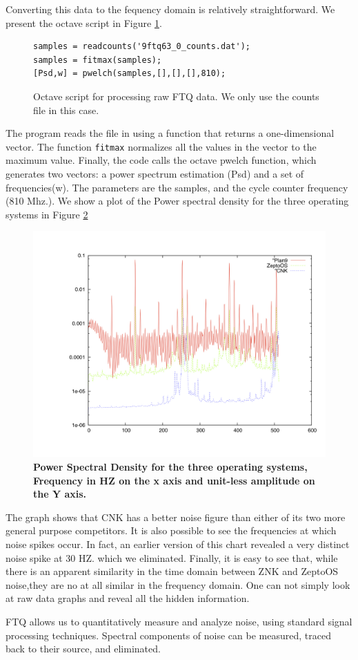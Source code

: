 Converting this data to the fequency domain is relatively straightforward. We present the octave script in Figure \ref{octave}. 
\begin{figure}[h]
\begin{center}
\begin{verbatim}
samples = readcounts('9ftq63_0_counts.dat');
samples = fitmax(samples);
[Psd,w] = pwelch(samples,[],[],[],810);
\end{verbatim}
\caption{Octave script for processing raw FTQ data. We only use the counts file in this case.}
\label{octave}
\end{center}
\end{figure}
The program reads the file in using a function that returns a one-dimensional vector. The function
{\tt fitmax} normalizes all the values in the vector to the maximum value. Finally, 
the code calls the octave pwelch function, which generates two vectors: a power spectrum estimation (Psd) and a set of frequencies(w). The parameters are the samples, and the 
cycle counter 
frequency (810 Mhz.). 
We show a plot of the Power spectral density for the three operating systems in Figure \ref{psd}
\begin{figure}[htbp]
\begin{center}
 \includegraphics[width=5in]{spectrum.jpg}
\caption{{\bf Power Spectral Density for the three operating systems, Frequency in HZ on the x axis
and unit-less amplitude on the Y axis.}}
\label{psd}
\end{center}
\end{figure}

The graph shows that CNK has a better noise figure than either of its two
more general purpose competitors. It is also possible to see
the frequencies at which noise spikes occur. In fact, an earlier version 
of this chart revealed a very distinct noise spike at 30 HZ. which we 
eliminated. Finally, it is easy to see that, while there is an apparent similarity in the time
domain between ZNK and ZeptoOS noise,they are no at all similar in the
frequency domain. One can not simply look at raw data graphs and 
reveal all the hidden information. 

FTQ allows us to quantitatively measure and analyze noise, using standard 
signal processing techniques. Spectral components of noise can be measured, 
traced back to their source, and eliminated. 


